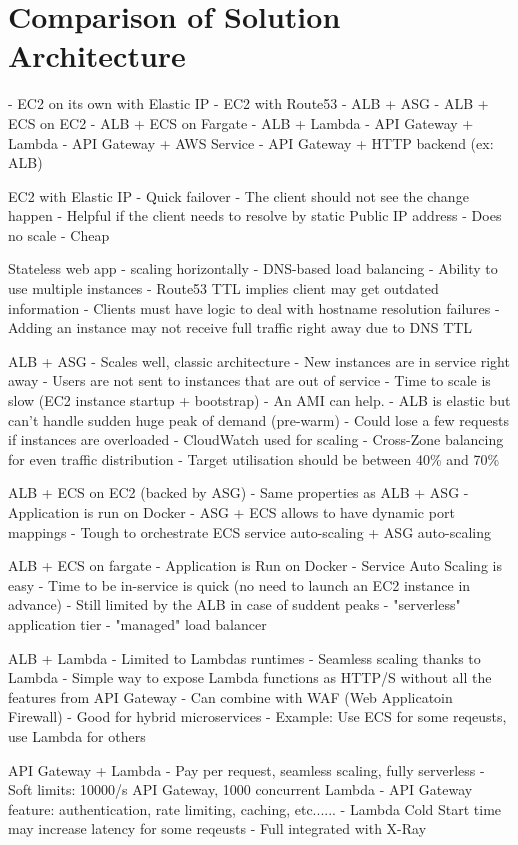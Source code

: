 \section{Comparison of Solution Architecture}
- EC2 on its own with Elastic IP
- EC2 with Route53
- ALB + ASG
- ALB + ECS on EC2
- ALB + ECS on Fargate
- ALB + Lambda
- API Gateway + Lambda
- API Gateway + AWS Service
- API Gateway + HTTP backend (ex: ALB)

EC2 with Elastic IP
- Quick failover
- The client should not see the change happen
- Helpful if the client needs to resolve by static Public IP address
- Does no scale
- Cheap

Stateless web app - scaling horizontally
- DNS-based load balancing
- Ability to use multiple instances
- Route53 TTL implies client may get outdated information
- Clients must have logic to deal with hostname resolution failures
- Adding an instance may not receive full traffic right away due to DNS TTL

ALB + ASG
- Scales well, classic architecture
- New instances are in service right away
- Users are not sent to instances that are out of service
- Time to scale is slow (EC2 instance startup + bootstrap) - An AMI can help.
- ALB is elastic but can't handle sudden huge peak of demand (pre-warm)
- Could lose a few requests if instances are overloaded
- CloudWatch used for scaling
- Cross-Zone balancing for even traffic distribution
- Target utilisation should be between 40\% and 70\%

ALB + ECS on EC2 (backed by ASG)
- Same properties as ALB + ASG
- Application is run on Docker
- ASG + ECS allows to have dynamic port mappings
- Tough to orchestrate ECS service auto-scaling + ASG auto-scaling

ALB + ECS on fargate
- Application is Run on Docker
- Service Auto Scaling is easy
- Time to be in-service is quick (no need to launch an EC2 instance in advance)
- Still limited by the ALB in case of suddent peaks
- "serverless" application tier
- "managed" load balancer

ALB + Lambda
- Limited to Lambdas runtimes
- Seamless scaling thanks to Lambda
- Simple way to expose Lambda functions as HTTP/S without all the features from API Gateway
- Can combine with WAF (Web Applicatoin Firewall)
- Good for hybrid microservices
- Example: Use ECS for some reqeusts, use Lambda for others

API Gateway + Lambda
- Pay per request, seamless scaling, fully serverless
- Soft limits: 10000/s API Gateway, 1000 concurrent Lambda
- API Gateway feature: authentication, rate limiting, caching, etc......
- Lambda Cold Start time may increase latency for some reqeusts
- Full integrated with X-Ray

